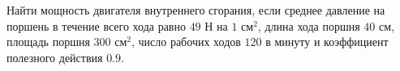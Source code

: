 Найти мощность двигателя внутреннего сгорания, если среднее давление на
поршень в течение всего хода равно $49$ Н на $1$ см$^2$, длина хода
поршня $40$ см, площадь поршня $300$ см$^2$, число рабочих ходов $120$ в
минуту и коэффициент полезного действия $0.9$.
